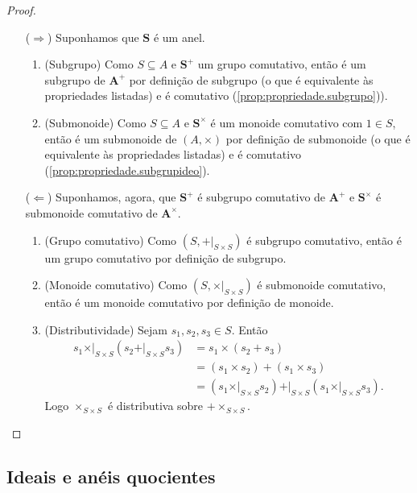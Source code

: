 \begin{proof}
	\begin{itemize}
	\item [($\Rightarrow$)] Suponhamos que $\bm S$ é um anel.
		\begin{enumerate}
		\item (Subgrupo) Como $S \subseteq A$ e $\bm S^+$ um grupo comutativo, então é um subgrupo de $\bm A^+$ por definição de subgrupo (o que é equivalente às propriedades listadas) e é comutativo (\ref{prop:propriedade.subgrupo})).

		\item (Submonoide) Como $S \subseteq A$ e $\bm S^\times$ é um monoide comutativo com $1 \in S$, então é um submonoide de $(A,\times)$ por definição de submonoide (o que é equivalente às propriedades listadas) e é comutativo (\ref{prop:propriedade.subgrupideo}).
		\end{enumerate}

	\item [($\Leftarrow$)] Suponhamos, agora, que $\bm S^+$ é subgrupo comutativo de $\bm A^+$ e $\bm S^\times$ é submonoide comutativo de $\bm A^\times$.
		\begin{enumerate}
		\item (Grupo comutativo) Como $(S,+|_{S \times S})$ é subgrupo comutativo, então é um grupo comutativo por definição de subgrupo.

		\item (Monoide comutativo) Como $(S,\times|_{S \times S})$ é submonoide comutativo, então é um monoide comutativo por definição de monoide.

		\item (Distributividade) Sejam $s_1,s_2,s_3 \in S$. Então
	\begin{align*}
	s_1 \mathrel{\times|_{S \times S}} (s_2 \mathrel{+|_{S \times S}} s_3) &= s_1 \times (s_2 + s_3) \\
		&= (s_1 \times s_2) + (s_1 \times s_3) \\
		&= (s_1 \mathrel{\times|_{S \times S}} s_2) \mathrel{+|_{S \times S}} (s_1 \mathrel{\times|_{S \times S}} s_3).
	\end{align*}
Logo $\times_{S \times S}$ é distributiva sobre $+ \times_{S \times S}$.
		\end{enumerate}
	\end{itemize}
\end{proof}

\subsection{Ideais e anéis quocientes}

